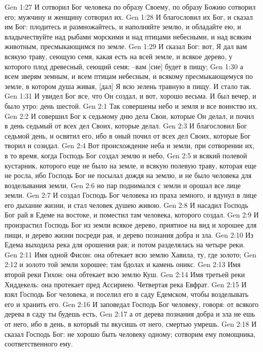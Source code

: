 Gen 1:27  И сотворил Бог человека по образу Своему, по образу Божию сотворил его; мужчину и женщину сотворил их.
Gen 1:28  И благословил их Бог, и сказал им Бог: плодитесь и размножайтесь, и наполняйте землю, и обладайте ею, и владычествуйте над рыбами морскими и над птицами небесными, и над всяким животным, пресмыкающимся по земле.
Gen 1:29  И сказал Бог: вот, Я дал вам всякую траву, сеющую семя, какая есть на всей земле, и всякое дерево, у которого плод древесный, сеющий семя; --вам [сие] будет в пищу;
Gen 1:30  а всем зверям земным, и всем птицам небесным, и всякому пресмыкающемуся по земле, в котором душа живая, [дал] Я всю зелень травную в пищу. И стало так.
Gen 1:31  И увидел Бог все, что Он создал, и вот, хорошо весьма. И был вечер, и было утро: день шестой.
Gen 2:1  Так совершены небо и земля и все воинство их.
Gen 2:2  И совершил Бог к седьмому дню дела Свои, которые Он делал, и почил в день седьмый от всех дел Своих, которые делал.
Gen 2:3  И благословил Бог седьмой день, и освятил его, ибо в оный почил от всех дел Своих, которые Бог творил и созидал.
Gen 2:4  Вот происхождение неба и земли, при сотворении их, в то время, когда Господь Бог создал землю и небо,
Gen 2:5  и всякий полевой кустарник, которого еще не было на земле, и всякую полевую траву, которая еще не росла, ибо Господь Бог не посылал дождя на землю, и не было человека для возделывания земли,
Gen 2:6  но пар поднимался с земли и орошал все лице земли.
Gen 2:7  И создал Господь Бог человека из праха земного, и вдунул в лице его дыхание жизни, и стал человек душею живою.
Gen 2:8  И насадил Господь Бог рай в Едеме на востоке, и поместил там человека, которого создал.
Gen 2:9  И произрастил Господь Бог из земли всякое дерево, приятное на вид и хорошее для пищи, и дерево жизни посреди рая, и дерево познания добра и зла.
Gen 2:10  Из Едема выходила река для орошения рая; и потом разделялась на четыре реки.
Gen 2:11  Имя одной Фисон: она обтекает всю землю Хавила, ту, где золото;
Gen 2:12  и золото той земли хорошее; там бдолах и камень оникс.
Gen 2:13  Имя второй реки Гихон: она обтекает всю землю Куш.
Gen 2:14  Имя третьей реки Хиддекель: она протекает пред Ассириею. Четвертая река Евфрат.
Gen 2:15  И взял Господь Бог человека, и поселил его в саду Едемском, чтобы возделывать его и хранить его.
Gen 2:16  И заповедал Господь Бог человеку, говоря: от всякого дерева в саду ты будешь есть,
Gen 2:17  а от дерева познания добра и зла не ешь от него, ибо в день, в который ты вкусишь от него, смертью умрешь.
Gen 2:18  И сказал Господь Бог: не хорошо быть человеку одному; сотворим ему помощника, соответственного ему.
